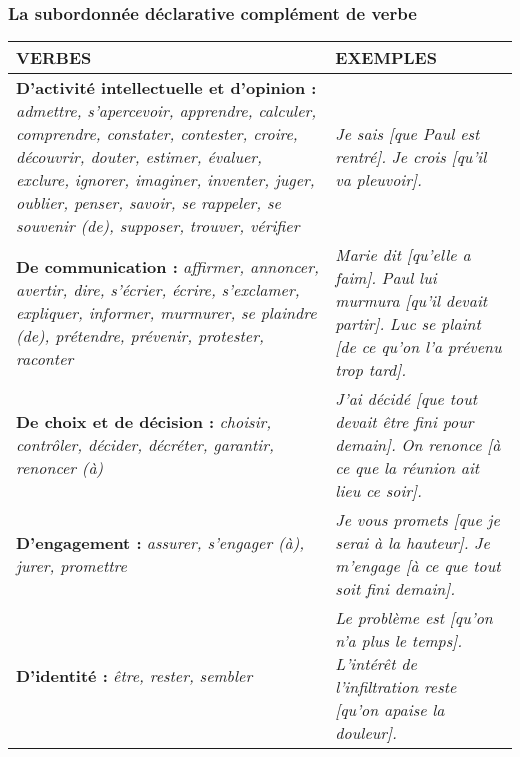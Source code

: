 \documentclass[UTF8]{report}
\begin{document}
\subsubsection{La subordonnée déclarative complément de verbe}



\begin{table}[H]
\centering
\small   
\begin{tabular}{|p{}|p{}|}
\hline
\rowcolor{cyan!20}
\textbf{VERBES} & \textbf{EXEMPLES} \\
\hline

\textbf{D’activité intellectuelle et d’opinion :} \newline
\textit{admettre, s’apercevoir, apprendre, calculer, comprendre, constater, contester, croire, découvrir, douter, estimer, évaluer, exclure, ignorer, imaginer, inventer, juger, oublier, penser, savoir, se rappeler, se souvenir (de), supposer, trouver, vérifier}
&
\textit{Je sais [que Paul est rentré].} \newline
\textit{Je crois [qu’il va pleuvoir].} \\
\hline

\textbf{De communication :} \newline
\textit{affirmer, annoncer, avertir, dire, s’écrier, écrire, s’exclamer, expliquer, informer, murmurer, se plaindre (de), prétendre, prévenir, protester, raconter}
&
\textit{Marie dit [qu’elle a faim].} \newline
\textit{Paul lui murmura [qu’il devait partir].} \newline
\textit{Luc se plaint [de ce qu’on l’a prévenu trop tard].} \\
\hline

\textbf{De choix et de décision :} \newline
\textit{choisir, contrôler, décider, décréter, garantir, renoncer (à)}
&
\textit{J’ai décidé [que tout devait être fini pour demain].} \newline
\textit{On renonce [à ce que la réunion ait lieu ce soir].} \\
\hline

\textbf{D’engagement :} \newline
\textit{assurer, s’engager (à), jurer, promettre}
&
\textit{Je vous promets [que je serai à la hauteur].} \newline
\textit{Je m’engage [à ce que tout soit fini demain].} \\
\hline

\textbf{D’identité :} \newline
\textit{être, rester, sembler}
&
\textit{Le problème est [qu’on n’a plus le temps].} \newline
\textit{L’intérêt de l’infiltration reste [qu’on apaise la douleur].} \\
\hline


\end{tabular}
\end{table}
\end{document}
